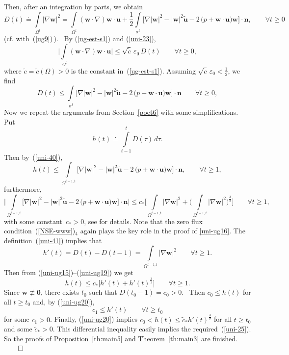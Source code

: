 \documentclass[11pt]{article}
\numberwithin{equation}{section}
\numberwithin{figure}{section}
\def\ue{{\mathbf u}}
\def\cc{{\tilde c}}
\def\tu{{\tilde{\mathbf u}}}
\def\n{{\mathbf n}}
\def\0{{\mathbf 0}}
\def\OO{{\Omega}}
\def\we{{\mathbf w}}
\def\e{{\varepsilon}}
\begin{document}
Then, after an integration by parts, we obtain
\begin{equation}  \label{uni-40mm-}
D(t)\doteq\int\limits_{\Omega^t}|\nabla\we|^2=\int\limits_{\OO^t}(\mathbf{w} \cdot \nabla)\we\cdot\mathbf{u}+
\frac12\int\limits_{\sigma^t}\biggl[\nabla|\we|^2-|\we|^2\tu-2\,\bigl(p+\we\cdot\ue\bigr)\we\biggr]\cdot\n,\qquad \forall t\ge0
\end{equation}
(cf. with~(\ref{ug9})\,). \ By (\ref{ug-est-s1}) and (\ref{uni-23}),
\begin{equation}\label{uni-41mm-}\biggl|\int\limits_{\OO^t}(\mathbf{w} \cdot \nabla)\we\cdot\mathbf{u}\biggr|
	\le \sqrt{\cc}\,\e_0\, D(t)\qquad\forall t\ge 0,\end{equation}
where $\cc=\cc(\Omega)>0$ is the constant in~(\ref{ug-est-s1}).  Assuming $\sqrt{\cc}\,\e_0<\frac12$, we find
\begin{equation}  \label{uni-40}
	D(t)\le\int\limits_{\sigma^t}\biggl[\nabla|\we|^2-|\we|^2\tu-2\,\bigl(p+\we\cdot\ue\bigr)\we\biggr]\cdot\n\qquad \forall t\ge0,
\end{equation}
Now we repeat the arguments from Section~\ref{poet6} with some simplifications.
Put
\begin{equation}\label{uni-41}
	h(t)\doteq \int\limits_{t-1}^t D(\tau)\,d\tau.
\end{equation}
Then by~(\ref{uni-40}),
\begin{equation}\label{uni-ug15}h(t)\le \int\limits_{\OO^{t-1,t}}\biggl[\nabla|\we|^2-|\we|^2\tu-2\,\bigl(p+\we\cdot\ue\bigr)\we\biggr]\cdot\n,\qquad
\forall t\ge 1,
\end{equation}
furthermore,
\begin{equation}\label{uni-ug16}
\biggl|\int\limits_{\OO^{t-1,t}}\biggl[\nabla|\we|^2-|\we|^2\tu-2\,\bigl(p+\we\cdot\ue\bigr)\we\biggr]\cdot\n\biggr|\le c_*
\biggl[ \int\limits_{\OO^{t-1,t}}|\nabla\we|^2+\biggl(\int\limits_{\OO^{t-1,t}}|\nabla\we|^2\biggr)^\frac32\biggr] \qquad\forall t\ge 1,
\end{equation}
with some constant~$c_*>0$, see \cite[proof of Theorem~2.2]{ladyzhenskaya1983determination} for details. Note that the zero flux condition~(\ref{NSE-www})$_4$ again plays the key role in the proof of \eqref{uni-ug16}. The definition~(\ref{uni-41}) implies that
\begin{equation}\label{uni-ug19}
h'(t)=D(t)-D(t-1)=\int\limits_{\OO^{t-1,t}}|\nabla\we|^2\qquad\forall t\ge 1.
\end{equation}
Then from (\ref{uni-ug15})--(\ref{uni-ug19}) we get
\begin{equation}\label{uni-ug20}h(t)\le c_*\biggl[h'(t)+h'(t)^\frac32\biggr]\qquad \forall t\ge 1.\end{equation}
Since $\we\not\equiv\0$, there exists $t_0$ such that $D(t_0-1)=c_0>0$. \ 
Then $c_0\le h(t)$ for all $t\ge t_0$ and, by (\ref{uni-ug20}),
$$
c_1\le h'(t)\qquad \forall t\ge t_0
$$
for some $c_1>0$. Finally, (\ref{uni-ug20}) implies $c_0<h(t)\le \cc_* h'(t)^\frac32$ for all $t\ge t_0$ and some $\cc_*>0$. This differential
inequality easily implies the required~(\ref{uni-25}). So the proofs of Proposition~\ref{th:main5}
and Theorem~\ref{th:main3} are finished. \hfill $\qed$
\end{document}

